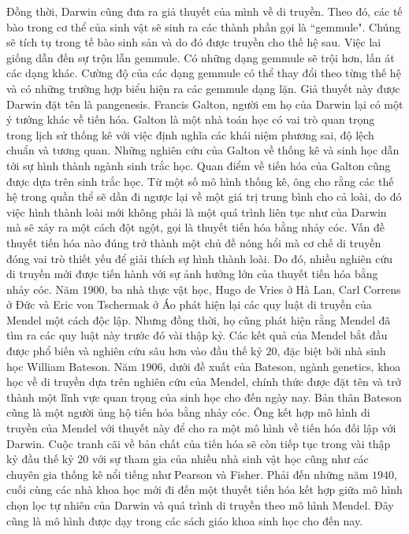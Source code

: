 \begin{multicols}{2}
	\vskip 0.1cm
	Đồng thời, Darwin cũng đưa ra giả thuyết của mình về di truyền. Theo đó, các tế bào trong cơ thể của sinh vật sẽ sinh ra các thành phần gọi là ``gemmule". Chúng sẽ tích tụ trong tế bào sinh sản và do đó được truyền cho thế hệ sau. Việc lai giống dẫn đến sự trộn lẫn gemmule. Có những dạng gemmule sẽ trội hơn, lấn át các dạng khác. Cường độ của các dạng gemmule có thể thay đổi theo từng thế hệ và có những trường hợp biểu hiện ra các gemmule dạng lặn. Giả thuyết này được Darwin đặt tên là pangenesis.
	\vskip 0.1cm
	Francis Galton, người em họ của Darwin lại có một ý tưởng khác về tiến hóa. Galton là một nhà toán học có vai trò quan trọng trong lịch sử thống kê với việc định nghĩa các khái niệm phương sai, độ lệch chuẩn và tương quan. Những nghiên cứu của Galton về thống kê và sinh học dẫn tới sự hình thành ngành sinh trắc học. Quan điểm về tiến hóa của Galton cũng được dựa trên  sinh trắc học. Từ một số mô hình thống kê, ông cho rằng các thế hệ trong quần thể sẽ dần đi ngược lại về một giá trị trung bình cho cả loài, do đó việc hình thành loài mới không phải là một quá trình liên tục như của Darwin mà sẽ xảy ra một cách đột ngột, gọi là thuyết tiến hóa bằng nhảy cóc.
	\vskip 0.1cm
	Vấn đề thuyết tiến hóa nào đúng trở thành một chủ đề nóng hổi mà cơ chế di truyền đóng vai trò thiết yếu để giải thích sự hình thành loài. Do đó, nhiều nghiên cứu di truyền mới được tiến hành với sự ảnh hưởng lớn của thuyết tiến hóa bằng nhảy cóc. Năm $1900$, ba nhà thực vật học, Hugo de Vries ở Hà Lan, Carl Correns ở Đức và Eric von Tschermak ở Áo phát hiện lại các quy luật di truyền của Mendel một cách độc lập. Nhưng đồng thời, họ cũng phát hiện rằng Mendel đã tìm ra các quy luật này trước đó vài thập kỷ. Các kết quả của Mendel bắt đầu được phổ biến và nghiên cứu sâu hơn vào đầu thế kỷ $20$, đặc biệt bởi nhà sinh học William Bateson. Năm $1906$, dưới đề xuất của Bateson, ngành genetics, khoa học về di truyền dựa trên nghiên cứu của Mendel, chính thức được đặt tên và trở thành một lĩnh vực quan trọng của sinh học cho đến ngày nay.
	\vskip 0.1cm
	Bản thân Bateson cũng là một người ủng hộ tiến hóa bằng nhảy cóc. Ông kết hợp mô hình di truyền của Mendel với thuyết này để cho ra một mô hình về tiến hóa đối lập với Darwin. Cuộc tranh cãi về bản chất của tiến hóa sẽ còn tiếp tục trong vài thập kỷ đầu thế kỷ $20$ với sự tham gia của nhiều nhà sinh vật học cũng như các chuyên gia thống kê nổi tiếng như Pearson và Fisher. Phải đến những năm $1940$, cuối cùng các nhà khoa học mới đi đến một thuyết tiến hóa kết hợp giữa  mô hình chọn lọc tự nhiên của Darwin và quá trình di truyền theo mô hình Mendel. Đây cũng là mô hình được dạy trong các sách giáo khoa sinh học cho đến nay.

\end{multicols}
